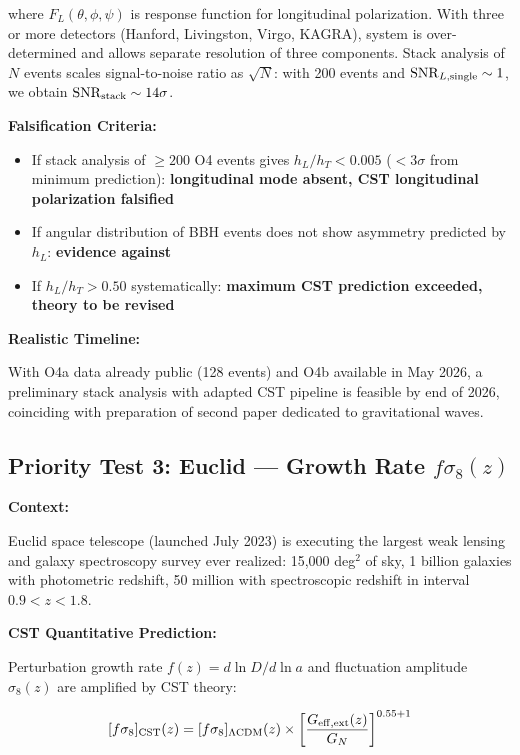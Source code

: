 \documentclass[11pt,a4paper]{article}
\providecommand{\tightlist}{\setlength{\itemsep}{0pt}\setlength{\parskip}{0pt}}
\begin{document}
where \(F_L(\theta,\phi,\psi)\) is response function for longitudinal
polarization. With three or more detectors (Hanford, Livingston, Virgo,
KAGRA), system is over-determined and allows separate resolution of
three components. Stack analysis of \(N\) events scales signal-to-noise
ratio as \(\sqrt{N}\): with 200 events and
\({\rm SNR}_{L,\rm single} \sim 1\), we obtain
\({\rm SNR}_{\rm stack} \sim 14\sigma\).

\textbf{Falsification Criteria:}

\begin{itemize}
\tightlist
\item
  If stack analysis of \(\geq 200\) O4 events gives \(h_L/h_T < 0.005\)
  (\(< 3\sigma\) from minimum prediction): \textbf{longitudinal mode
  absent, CST longitudinal polarization falsified}
\item
  If angular distribution of BBH events does not show asymmetry
  predicted by \(h_L\): \textbf{evidence against}
\item
  If \(h_L/h_T > 0.50\) systematically: \textbf{maximum CST prediction
  exceeded, theory to be revised}
\end{itemize}

\textbf{Realistic Timeline:}

With O4a data already public (128 events) and O4b available in May 2026,
a preliminary stack analysis with adapted CST pipeline is feasible by
end of 2026, coinciding with preparation of second paper dedicated to
gravitational waves.

\hypertarget{priority-test-3-euclid-growth-rate-f-ux3c3ux2088z}{%
\subsection{Priority Test 3: Euclid --- Growth Rate $f\sigma_{8}(z)$}\label{priority-test-3-euclid-growth-rate-f-ux3c3ux2088z}}

\textbf{Context:}

Euclid space telescope (launched July 2023) is executing the largest
weak lensing and galaxy spectroscopy survey ever realized: 15,000 deg$^{2}$
of sky, 1 billion galaxies with photometric redshift, 50 million with
spectroscopic redshift in interval \(0.9 < z < 1.8\).

\textbf{CST Quantitative Prediction:}

Perturbation growth rate \(f(z) = d\ln D/d\ln a\) and fluctuation
amplitude \(\sigma_8(z)\) are amplified by CST theory:

\[[f\sigma_8]_{\rm CST}(z) = [f\sigma_8]_{\Lambda{\rm CDM}}(z) \times \left[\frac{G_{\rm eff,ext}(z)}{G_N}\right]^{0.55+1}\]
\end{document}
